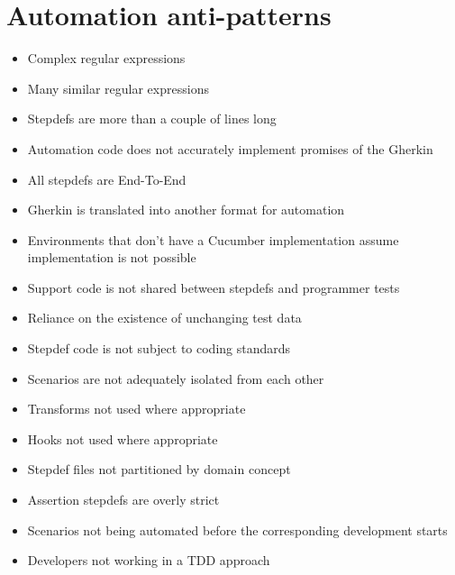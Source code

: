 \chapter*{Automation anti-patterns}

\ifnotes

\fi

\ifcontent

    \begin{itemize}
        \item Complex regular expressions
        \item Many similar regular expressions
        \item Stepdefs are more than a couple of lines long
        \item Automation code does not accurately implement promises of the Gherkin
        \item All stepdefs are End-To-End
        \item Gherkin is translated into another format for automation
        \item Environments that don't have a Cucumber implementation assume implementation is not possible
        \item Support code is not shared between stepdefs and programmer tests
        \item Reliance on the existence of unchanging test data
        \item Stepdef code is not subject to coding standards
        \item Scenarios are not adequately isolated from each other
        \item Transforms not used where appropriate
        \item Hooks not used where appropriate
        \item Stepdef files not partitioned by domain concept
        \item Assertion stepdefs are overly strict
        \item Scenarios not being automated before the corresponding development starts
        \item Developers not working in a TDD approach
    \end{itemize}



\fi